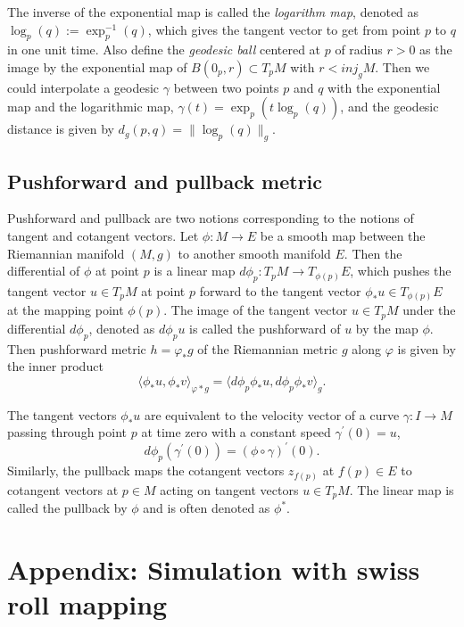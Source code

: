 \documentclass[11pt,a4paper,]{article}
\begin{document}
The inverse of the exponential map is called the \emph{logarithm map}, denoted as \(\log_p(q):= \exp^{-1}_p(q)\), which gives the tangent vector to get from point \(p\) to \(q\) in one unit time. Also define the \emph{geodesic ball} centered at \(p\) of radius \(r > 0\) as the image by the exponential map of \(B(0_p, r) \subset T_pM\) with \(r < \textit{inj}_gM\). Then we could interpolate a geodesic \(\gamma\) between two points \(p\) and \(q\) with the exponential map and the logarithmic map, \(\gamma(t) = \exp_p(t\log_p(q))\), and the geodesic distance is given by \(d_g(p,q) = \|\log_p(q)\|_g\).

\hypertarget{pushforward-and-pullback-metric}{%
\subsection{Pushforward and pullback metric}\label{pushforward-and-pullback-metric}}

Pushforward and pullback are two notions corresponding to the notions of tangent and cotangent vectors.
Let \(\phi: M \rightarrow E\) be a smooth map between the Riemannian manifold \((M,g)\) to another smooth manifold \(E\). Then the differential of \(\phi\) at point \(p\) is a linear map \(d\phi_p: T_pM \rightarrow T_{\phi (p)}E\), which pushes the tangent vector \(u \in T_pM\) at point \(p\) forward to the tangent vector \(\phi_*u \in T_{\phi (p)}E\) at the mapping point \(\phi(p)\).
The image of the tangent vector \(u \in T_pM\) under the differential \(d\phi_p\), denoted as \(d\phi_p u\) is called the pushforward of \(u\) by the map \(\phi\).
Then pushforward metric \(h=\varphi_*g\) of the Riemannian metric \(g\) along \(\varphi\) is given by the inner product
\[
\langle \phi_*u,\phi_*v \rangle_{\varphi*g} = \langle d\phi_p \phi_*u, d\phi_p \phi_*v \rangle_{g}.
\]

The tangent vectors \(\phi_*u\) are equivalent to the velocity vector of a curve \(\gamma: I\rightarrow M\) passing through point \(p\) at time zero with a constant speed \(\gamma^{\prime}(0)=u\),
\[
d\phi_p(\gamma^{\prime}(0)) = (\phi \circ \gamma)^\prime (0).
\]
Similarly, the pullback maps the cotangent vectors \(z_{f(p)}\) at \(f(p) \in E\) to cotangent vectors at \(p \in M\) acting on tangent vectors \(u \in T_pM\). The linear map is called the pullback by \(\phi\) and is often denoted as \(\phi^*\).

\hypertarget{swissrollappe}{%
\section{Appendix: Simulation with swiss roll mapping}\label{swissrollappe}}
\end{document}
